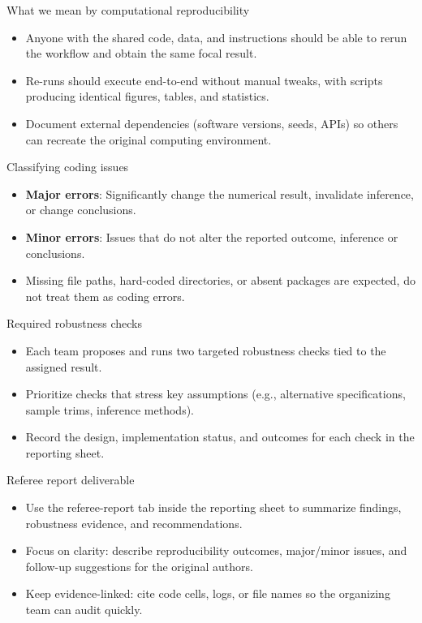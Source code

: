 \documentclass[aspectratio=169,professionalfonts]{beamer}
\begin{document}
\begin{frame}{What we mean by computational reproducibility}
  \begin{itemize}
    \item Anyone with the shared code, data, and instructions should be able to rerun the workflow and obtain the same focal result.
    \item Re-runs should execute end-to-end without manual tweaks, with scripts producing identical figures, tables, and statistics.
    \item Document external dependencies (software versions, seeds, APIs) so others can recreate the original computing environment.
  \end{itemize}
\end{frame}

\begin{frame}{Classifying coding issues}
  \begin{itemize}
    \item \textbf{Major errors}: Significantly change the numerical result, invalidate inference, or change conclusions.
    \item \textbf{Minor errors}: Issues that do not alter the reported outcome, inference or conclusions.
    \item Missing file paths, hard-coded directories, or absent packages are expected, do not treat them as coding errors.
  \end{itemize}
\end{frame}

\begin{frame}{Required robustness checks}
  \begin{itemize}
    \item Each team proposes and runs two targeted robustness checks tied to the assigned result.
    \item Prioritize checks that stress key assumptions (e.g., alternative specifications, sample trims, inference methods).
    \item Record the design, implementation status, and outcomes for each check in the reporting sheet.
  \end{itemize}
\end{frame}

\begin{frame}{Referee report deliverable}
  \begin{itemize}
    \item Use the referee-report tab inside the reporting sheet to summarize findings, robustness evidence, and recommendations.
    \item Focus on clarity: describe reproducibility outcomes, major/minor issues, and follow-up suggestions for the original authors.
    \item Keep evidence-linked: cite code cells, logs, or file names so the organizing team can audit quickly.
  \end{itemize}
\end{frame}
\end{document}
